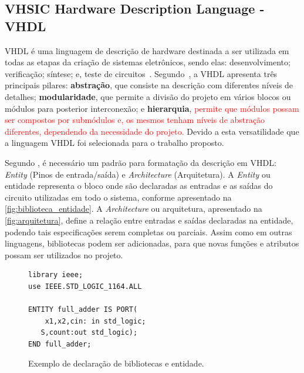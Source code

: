 

\subsection{\label{sec:vhdl_seção}VHSIC Hardware Description Language - VHDL}
VHDL é uma linguagem de descrição de hardware destinada a ser utilizada em todas as etapas da criação de sistemas eletrônicos, sendo elas: desenvolvimento; verificação; síntese; e, teste de circuitos~\cite{IEEEVHDLLanguage}.
% 
Segundo~, a VHDL apresenta três principais pilares: \textbf{abstração}, que consiste na descrição com diferentes níveis de detalhes; \textbf{modularidade}, que permite a divisão do projeto em vários blocos ou módulos para posterior interconexão; e \textbf{hierarquia}, \textcolor{red}{permite que módulos possam ser compostos por submódulos e, os mesmos tenham níveis de abstração diferentes, dependendo da necessidade do projeto.} Devido a esta versatilidade que a linguagem VHDL foi selecionada para o trabalho proposto.

\par
Segundo , é necessário um padrão para formatação da descrição em VHDL: \textit{Entity} (Pinos de entrada/saída) e \textit{Architecture} (Arquitetura). A \textit{Entity} ou entidade representa o bloco onde são declaradas as entradas e as saídas do circuito utilizadas em todo o sistema, conforme apresentado na \autoref{fig:biblioteca_entidade}. A \textit{Architecture} ou arquitetura, apresentado na \autoref{fig:arquitetura}, define a relação entre entradas e saídas declaradas na entidade, podendo tais especificações serem completas ou parciais. Assim como em outras linguagens, bibliotecas podem ser adicionadas, para que novas funções e atributos possam ser utilizados no projeto.

\begin{figure}[H]
\caption{\label{fig:biblioteca_entidade} Exemplo de declaração de bibliotecas e entidade.}
	\begin{center}
    \begin{minipage}{0.6\textwidth}
    \begin{lstlisting}       
library ieee;
use IEEE.STD_LOGIC_1164.ALL

ENTITY full_adder IS PORT(
	x1,x2,cin: in std_logic;
   S,count:out std_logic);
END full_adder;
\end{lstlisting}
    \end{minipage}
	\end{center}
\end{figure}


